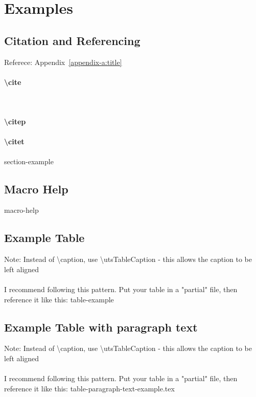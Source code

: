 \chapter{Examples}
\section{Citation and Referencing}
Referece: Appendix~\ref{appendix-a:title}

\subsubsection{\textbackslash cite}
\cite{ombudsman2024machinery} \\

\subsubsection{\textbackslash citep}
\citep{ombudsman2024machinery}

\subsubsection{\textbackslash citet}
\citet{dang2023toward}





{section-example}

\section{Macro Help}
{macro-help}




\section{Example Table}
Note: Instead of \textbackslash{caption}, use \textbackslash{utsTableCaption} - this allows the caption to be left aligned\\
\\
I recommend following this pattern. Put your table in a "partial" file, then reference it like this:
{table-example}




\section{Example Table with paragraph text}
Note: Instead of \textbackslash{caption}, use \textbackslash{utsTableCaption} - this allows the caption to be left aligned\\
\\
I recommend following this pattern. Put your table in a "partial" file, then reference it like this:
{table-paragraph-text-example.tex}




